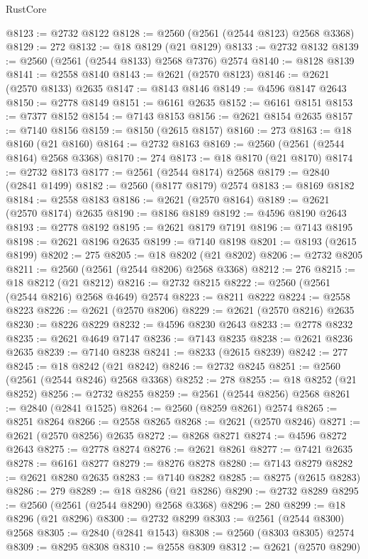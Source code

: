 \begin{lexlean}{RustCore}
\begin{coremodule}
@8123 := @2732 @8122
@8128 := @2560 (@2561 (@2544 @8123) @2568 @3368)
@8129 := 272
@8132 := @18 @8129 (@21 @8129)
@8133 := @2732 @8132
@8139 := @2560 (@2561 (@2544 @8133) @2568 @7376) @2574
@8140 := @8128 @8139
@8141 := @2558 @8140
@8143 := @2621 (@2570 @8123)
@8146 := @2621 (@2570 @8133) @2635
@8147 := @8143 @8146
@8149 := @4596 @8147 @2643
@8150 := @2778 @8149
@8151 := @6161 @2635
@8152 := @6161 @8151
@8153 := @7377 @8152
@8154 := @7143 @8153
@8156 := @2621 @8154 @2635
@8157 := @7140 @8156
@8159 := @8150 (@2615 @8157)
@8160 := 273
@8163 := @18 @8160 (@21 @8160)
@8164 := @2732 @8163
@8169 := @2560 (@2561 (@2544 @8164) @2568 @3368)
@8170 := 274
@8173 := @18 @8170 (@21 @8170)
@8174 := @2732 @8173
@8177 := @2561 (@2544 @8174) @2568
@8179 := @2840 (@2841 @1499)
@8182 := @2560 (@8177 @8179) @2574
@8183 := @8169 @8182
@8184 := @2558 @8183
@8186 := @2621 (@2570 @8164)
@8189 := @2621 (@2570 @8174) @2635
@8190 := @8186 @8189
@8192 := @4596 @8190 @2643
@8193 := @2778 @8192
@8195 := @2621 @8179 @7191
@8196 := @7143 @8195
@8198 := @2621 @8196 @2635
@8199 := @7140 @8198
@8201 := @8193 (@2615 @8199)
@8202 := 275
@8205 := @18 @8202 (@21 @8202)
@8206 := @2732 @8205
@8211 := @2560 (@2561 (@2544 @8206) @2568 @3368)
@8212 := 276
@8215 := @18 @8212 (@21 @8212)
@8216 := @2732 @8215
@8222 := @2560 (@2561 (@2544 @8216) @2568 @4649) @2574
@8223 := @8211 @8222
@8224 := @2558 @8223
@8226 := @2621 (@2570 @8206)
@8229 := @2621 (@2570 @8216) @2635
@8230 := @8226 @8229
@8232 := @4596 @8230 @2643
@8233 := @2778 @8232
@8235 := @2621 @4649 @7147
@8236 := @7143 @8235
@8238 := @2621 @8236 @2635
@8239 := @7140 @8238
@8241 := @8233 (@2615 @8239)
@8242 := 277
@8245 := @18 @8242 (@21 @8242)
@8246 := @2732 @8245
@8251 := @2560 (@2561 (@2544 @8246) @2568 @3368)
@8252 := 278
@8255 := @18 @8252 (@21 @8252)
@8256 := @2732 @8255
@8259 := @2561 (@2544 @8256) @2568
@8261 := @2840 (@2841 @1525)
@8264 := @2560 (@8259 @8261) @2574
@8265 := @8251 @8264
@8266 := @2558 @8265
@8268 := @2621 (@2570 @8246)
@8271 := @2621 (@2570 @8256) @2635
@8272 := @8268 @8271
@8274 := @4596 @8272 @2643
@8275 := @2778 @8274
@8276 := @2621 @8261
@8277 := @7421 @2635
@8278 := @6161 @8277
@8279 := @8276 @8278
@8280 := @7143 @8279
@8282 := @2621 @8280 @2635
@8283 := @7140 @8282
@8285 := @8275 (@2615 @8283)
@8286 := 279
@8289 := @18 @8286 (@21 @8286)
@8290 := @2732 @8289
@8295 := @2560 (@2561 (@2544 @8290) @2568 @3368)
@8296 := 280
@8299 := @18 @8296 (@21 @8296)
@8300 := @2732 @8299
@8303 := @2561 (@2544 @8300) @2568
@8305 := @2840 (@2841 @1543)
@8308 := @2560 (@8303 @8305) @2574
@8309 := @8295 @8308
@8310 := @2558 @8309
@8312 := @2621 (@2570 @8290)

\end{coremodule}
\end{lexlean}
